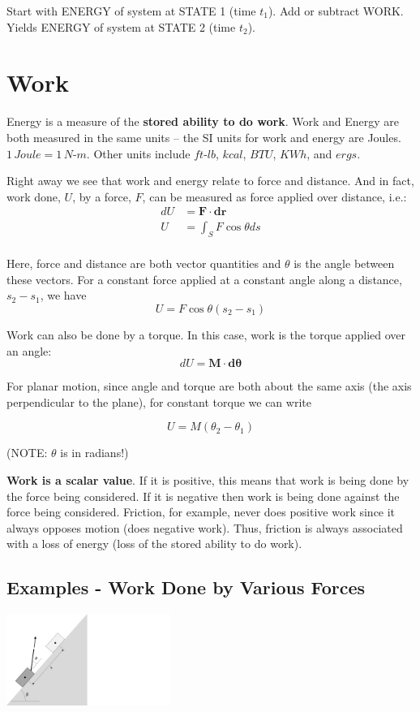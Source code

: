 \documentclass[12pt,letterpaper,twoside]{report}
\begin{document}
Start with ENERGY of system at STATE 1 (time $t_1$). Add or subtract WORK. Yields ENERGY of system at STATE 2 (time $t_2$).

\section{Work}
Energy is a measure of the \textbf{stored ability to do work}.  Work and Energy are both measured in the same units – the SI units for work and energy are Joules.  $1 \, Joule = 1 \, N$-$m$.  Other units include $ft$-$lb$, $kcal$, $BTU$, $KWh$, and $ergs$.  

Right away we see that work and energy relate to force and distance.  And in fact, work done, $U$, by a force, $F$, can be measured as force applied over distance, i.e.:
\begin{align*}
dU &= \bm{F} \cdot \bm{dr}\\
U &= \int_S F \cos \theta ds\\
\end{align*}

Here, force and distance are both vector quantities and $\theta$ is the angle between these vectors.  For a constant force applied at a constant angle along a distance, $s_2 - s_1$, we have
\[U = F \cos \theta (s_2 - s_1) \]

Work  can also  be done by a torque. In this case, work is the torque applied over an angle: 
\[
dU = \bm{M} \cdot \bm{d \theta}
\]

For planar motion, since angle and torque are both about the same axis (the axis perpendicular to the plane), for constant torque we can write

\[
U = M(\theta_2 - \theta_1)
\]

(NOTE:  $\theta$ is in radians!)

\textbf{Work is a scalar value}.  If it is positive, this means that work is being done by the force being considered.  If it is negative then work is being done against the force being considered.  Friction, for example, never does positive work since it always opposes motion (does negative work).  Thus, friction is always associated with a loss of energy (loss of the stored ability to do work).

\subsection{Examples - Work Done by Various Forces}

 \includegraphics[trim={0cm 0cm 18cm 1cm},clip,width=0.4\textwidth, left]{Slide64}
\end{document}
